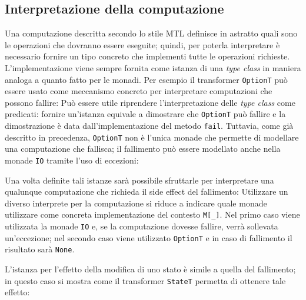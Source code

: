 \subsection{Interpretazione della computazione}
Una computazione descritta secondo lo stile MTL definisce in astratto quali sono le operazioni che dovranno essere eseguite; quindi, per poterla interpretare è necessario fornire un tipo concreto che implementi tutte le operazioni richieste.
L'implementazione viene sempre fornita come istanza di una \emph{type class} in maniera analoga a quanto fatto per le monadi.
Per esempio il transformer \lstinline{OptionT} può essere usato come meccanismo concreto per interpretare computazioni che possono fallire:
Può essere utile riprendere l'interpretazione delle \emph{type class} come predicati: fornire un'istanza equivale a dimostrare che \lstinline{OptionT} può fallire e la dimostrazione è data dall'implementazione del metodo \lstinline{fail}. Tuttavia, come già descritto in precedenza, \lstinline{OptionT} non è l'unica monade che permette di modellare una computazione che fallisca; il fallimento può essere modellato anche nella monade \lstinline{IO} tramite l'uso di eccezioni:

Una volta definite tali istanze sarà possibile sfruttarle per interpretare una qualunque computazione che richieda il side effect del fallimento:
Utilizzare un diverso interprete per la computazione si riduce a indicare quale monade utilizzare come concreta implementazione del contesto \lstinline{M[_]}. Nel primo caso viene utilizzata la monade \lstinline{IO} e, se la computazione dovesse fallire, verrà sollevata un'eccezione; nel secondo caso viene utilizzato \lstinline{OptionT} e in caso di fallimento il risultato sarà \lstinline{None}.

L'istanza per l'effetto della modifica di uno stato è simile a quella del fallimento; in questo caso si mostra come il transformer \lstinline{StateT} permetta di ottenere tale effetto:

